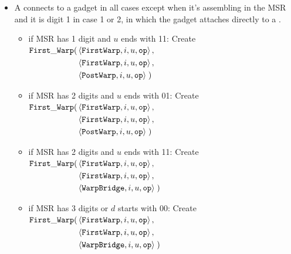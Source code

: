 \begin{itemize}
        \item A {\firstwarp} connects to a {\warpbridge} gadget in all cases except when it's assembling
              in the MSR and it is digit 1 in case 1 or 2, in which the {\firstwarp} gadget attaches directly
              to a {\postwarp}.

        \begin{itemize}
            \item if MSR has 1 digit and $u$ ends with 11: Create
            $\begin{aligned}[t]
                {\tt First\_Warp}(& \left\langle {\tt FirstWarp}, i, u, {\tt op} \right\rangle, \\
                           & \left\langle {\tt FirstWarp}, i, u, {\tt op} \right\rangle, \\
                           & \left\langle {\tt PostWarp},  i, u, {\tt op} \right\rangle \;)
            \end{aligned}$
            \vspace{.5cm}


            \item if MSR has 2 digits and $u$ ends with 01: Create
            $\begin{aligned}[t]
                {\tt First\_Warp}(& \left\langle {\tt FirstWarp}, i, u, {\tt op} \right\rangle, \\
                & \left\langle {\tt FirstWarp},            i, u, {\tt op} \right\rangle, \\
                & \left\langle {\tt PostWarp},             i, u, {\tt op} \right\rangle \;)
            \end{aligned}$
            \vspace{.5cm}


            \item if MSR has 2 digits and $u$ ends with 11: Create
            $\begin{aligned}[t]
                {\tt First\_Warp}(& \left\langle {\tt FirstWarp}, i, u, {\tt op} \right\rangle, \\
                & \left\langle {\tt FirstWarp},            i, u, {\tt op} \right\rangle, \\
                & \left\langle {\tt WarpBridge},           i, u, {\tt op} \right\rangle \;)
            \end{aligned}$
            \vspace{.5cm}

            \item if MSR has 3 digits or $d$ starts with 00: Create
            $\begin{aligned}[t]
                {\tt First\_Warp}(& \left\langle {\tt FirstWarp},  i, u, {\tt op} \right\rangle, \\
                           & \left\langle {\tt FirstWarp},  i, u, {\tt op} \right\rangle, \\
                           & \left\langle {\tt WarpBridge}, i, u, {\tt op} \right\rangle \;)
            \end{aligned}$


\end{itemize}
\end{itemize}

